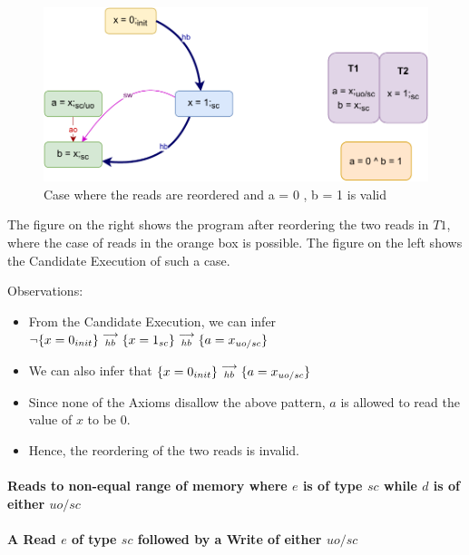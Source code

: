         \begin{figure}[H]
            \centering
            \includegraphics[scale=0.7]{5.InstructionReordering/4.ValidReorderingCandidate/Example1R(Rsc-Ruo,sc).pdf}
            \caption{Case where the reads are reordered and a = 0 , b = 1 is valid}
        \end{figure}

        The figure on the right shows the program after reordering the two reads in $T1$, where the case of reads in the orange box is possible. 
        The figure on the left shows the Candidate Execution of such a case. 

        Observations:
        \begin{itemize}
            \item From the Candidate Execution, we can infer $\neg\{x=0_{init}\}\stackrel{\longrightarrow}{_{hb}}\{x=1_{sc}\}\stackrel{\longrightarrow}{_{hb}}\{a=x_{uo/sc}\}$
            \item We can also infer that $\{x=0_{init}\}\stackrel{\longrightarrow}{_{hb}}\{a=x_{uo/sc}\}$    
            \item Since none of the Axioms disallow the above pattern, $a$ is allowed to read the value of $x$ to be $0$.
            \item Hence, the reordering of the two reads is invalid. 
        \end{itemize}
    \paragraph{Reads to non-equal range  of memory where $e$ is of type $sc$ while $d$ is of either $uo/sc$}

    \paragraph{A Read $e$ of type $sc$ followed by a Write of either $uo/sc$}
        

